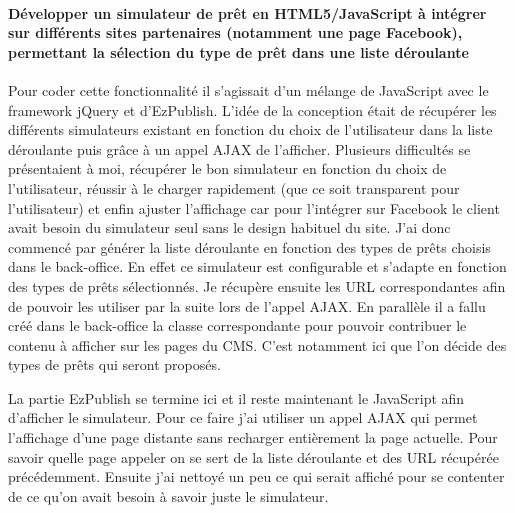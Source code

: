 \documentclass[a4paper,11pt,twoside]{report}
\begin{document}
      \paragraph*{Développer un simulateur de prêt en HTML5/JavaScript à intégrer sur différents sites partenaires (notamment une page Facebook), permettant la sélection du type de prêt dans une liste déroulante}
      Pour coder cette fonctionnalité il s'agissait d'un mélange de JavaScript avec le framework jQuery et d'EzPublish. L'idée de la conception était de récupérer les différents simulateurs existant en fonction du choix de l'utilisateur dans la liste déroulante puis grâce à un appel AJAX de l'afficher. Plusieurs difficultés se présentaient à moi, récupérer le bon simulateur en fonction du choix de l'utilisateur, réussir à le charger rapidement (que ce soit transparent pour l'utilisateur) et enfin ajuster l'affichage car pour l'intégrer sur Facebook le client avait besoin du simulateur seul sans le design habituel du site. J'ai donc commencé par générer la liste déroulante en fonction des types de prêts choisis dans le back-office. En effet ce simulateur est configurable et s'adapte en fonction des types de prêts sélectionnés. Je récupère ensuite les URL correspondantes afin de pouvoir les utiliser par la suite lors de l'appel AJAX. En parallèle il a fallu créé dans le back-office la classe correspondante pour pouvoir contribuer le contenu à afficher sur les pages du CMS. C'est notamment ici que l'on décide des types de prêts qui seront proposés.
      
      La partie EzPublish se termine ici et il reste maintenant le JavaScript afin d'afficher le simulateur. Pour ce faire j'ai utiliser un appel AJAX qui permet l'affichage d'une page distante sans recharger entièrement la page actuelle. Pour savoir quelle page appeler on se sert de la liste déroulante et des URL récupérée précédemment. Ensuite j'ai nettoyé un peu ce qui serait affiché pour se contenter de ce qu'on avait besoin à savoir juste le simulateur.
      
\end{document}
